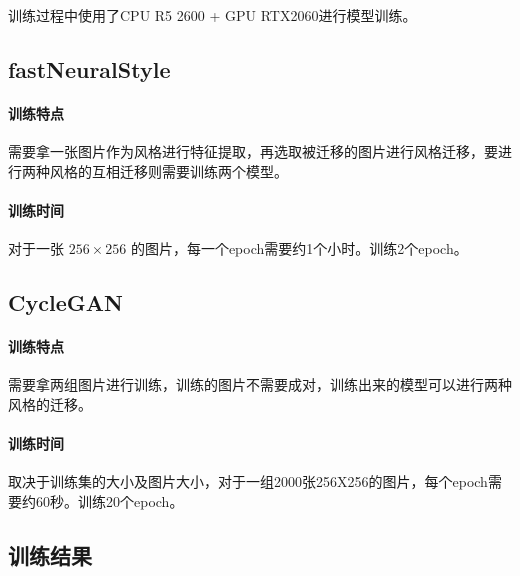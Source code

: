 \documentclass[conference]{IEEEtran}
\begin{document}
训练过程中使用了CPU R5 2600 + GPU RTX2060进行模型训练。

\subsection{fastNeuralStyle}

\paragraph{训练特点}需要拿一张图片作为风格进行特征提取，再选取被迁移的图片进行风格迁移，要进行两种风格的互相迁移则需要训练两个模型。

\paragraph{训练时间} 对于一张 $256 \times 256$ 的图片，每一个epoch需要约1个小时。训练2个epoch。

\subsection{CycleGAN}

\paragraph{训练特点} 需要拿两组图片进行训练，训练的图片不需要成对，训练出来的模型可以进行两种风格的迁移。

\paragraph{训练时间} 取决于训练集的大小及图片大小，对于一组2000张256X256的图片，每个epoch需要约60秒。训练20个epoch。

\subsection{训练结果}
\end{document}
